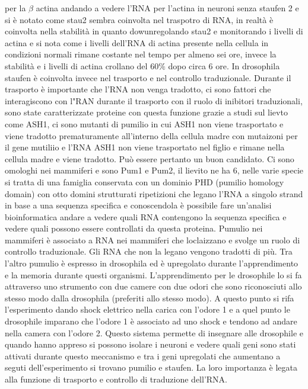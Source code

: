 per la $\beta$ actina andando a vedere l'RNA per l'actina in neuroni senza staufen 2 e si \`e notato come stau2 sembra coinvolta nel traspotro di RNA, in realt\`a \`e coinvolta nella
stabilit\`a in quanto dowunregolando stau2 e monitorando i livelli di actina e si nota come i livelli dell'RNA di actina presente nella cellula in condizioni normali rimane costante nel
tempo per almeno sei ore, invece la stabilit\`a e i livelli di actina crollano del $60\%$ dopo circa $6$ ore. In drosophila staufen \`e coinvolta invece nel trasporto e nel controllo
traduzionale. Durante il trasporto \`e importante che l'RNA non venga tradotto, ci sono fattori che interagiscono con l"RAN durante il trasporto con il ruolo di inibitori traduzionali, 
sono state caratterizzate proteine con questa funzione grazie a studi sul lievto come ASH1, ci sono mutanti di pumilio in cui ASH1 non viene trasportato e viene tradotto prematuramente 
all'interno della cellula madre con mutaizoni per il gene mutiliio e l'RNA ASH1 non viene trasportato nel figlio e rimane nella cellula madre e viene tradotto. Pu\`o essere pertanto 
un buon candidato. Ci sono omologhi nei mammiferi e sono Pum1 e Pum2, il lievito ne ha 6, nelle varie specie si tratta di una famiglia conservata con un dominio PHD (pumilio homology 
domain) con otto domini strutturati ripetizioni che legano l'RNA a singolo strand in base a una sequenza specifica e conoscendola \`e possibile fare un'analisi bioinformatica andare a 
vedere quali RNA contengono la sequenza specifica e vedere quali possono essere controllati da questa proteina. Pumulio nei mammiferi \`e associato a RNA nei mammiferi che loclaizzano
e svolge un ruolo di controllo traduzionale. Gli RNA che non la legano vengono tradotti di pi\`u. Tra l'altro pumulio \`e espresso in drosophila ed \`e upregolato durante l'apprendimento
e la memoria durante questi organismi. L'apprendimento per le drosophile lo si fa attraverso uno strumento con due camere con due odori che sono riconosciuti allo stesso modo dalla 
drosophila (preferiti allo stesso modo). A questo punto si rifa l'esperimento dando shock elettrico nella carica con l'odore 1 e a quel punto le drosophile imparano che l'odore 1 \`e 
associato ad uno shock e tendono ad andare nella camera con l'odore 2. Questo sistema permette di insegnare alle drosophile e quando hanno appreso si possono isolare i neuroni e vedere 
quali geni sono stati attivati durante questo meccanismo e tra i geni upregolati che aumentano a seguti dell'esperimento si trovano pumilio e staufen. La loro importanza \`e legata alla
funzione di trasporto e controllo di traduzione dell'RNA. 
